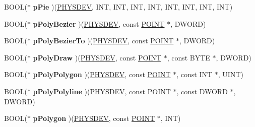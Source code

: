 \begin{DoxyCompactItemize}
\item 
\mbox{\label{structgdi__dc__funcs_a0a90d1be16b77035815899bf46dbb0e9}} 
B\+O\+OL($\ast$ {\bfseries p\+Pie} )(\hyperlink{structgdi__physdev}{P\+H\+Y\+S\+D\+EV}, I\+NT, I\+NT, I\+NT, I\+NT, I\+NT, I\+NT, I\+NT, I\+NT)
\item 
\mbox{\label{structgdi__dc__funcs_a0373ee82368c8853e6fad0bb7c0d35b0}} 
B\+O\+OL($\ast$ {\bfseries p\+Poly\+Bezier} )(\hyperlink{structgdi__physdev}{P\+H\+Y\+S\+D\+EV}, const \hyperlink{structtag_p_o_i_n_t}{P\+O\+I\+NT} $\ast$, D\+W\+O\+RD)
\item 
\mbox{\label{structgdi__dc__funcs_af45fd98166a7aa528619cf2a1243f98d}} 
B\+O\+OL($\ast$ {\bfseries p\+Poly\+Bezier\+To} )(\hyperlink{structgdi__physdev}{P\+H\+Y\+S\+D\+EV}, const \hyperlink{structtag_p_o_i_n_t}{P\+O\+I\+NT} $\ast$, D\+W\+O\+RD)
\item 
\mbox{\label{structgdi__dc__funcs_af248a7f1499c9df04a9385c5527378dc}} 
B\+O\+OL($\ast$ {\bfseries p\+Poly\+Draw} )(\hyperlink{structgdi__physdev}{P\+H\+Y\+S\+D\+EV}, const \hyperlink{structtag_p_o_i_n_t}{P\+O\+I\+NT} $\ast$, const B\+Y\+TE $\ast$, D\+W\+O\+RD)
\item 
\mbox{\label{structgdi__dc__funcs_a17a8a34aded868051182b012b9ede9ed}} 
B\+O\+OL($\ast$ {\bfseries p\+Poly\+Polygon} )(\hyperlink{structgdi__physdev}{P\+H\+Y\+S\+D\+EV}, const \hyperlink{structtag_p_o_i_n_t}{P\+O\+I\+NT} $\ast$, const I\+NT $\ast$, U\+I\+NT)
\item 
\mbox{\label{structgdi__dc__funcs_a491ad66d5326571875f33498499066d7}} 
B\+O\+OL($\ast$ {\bfseries p\+Poly\+Polyline} )(\hyperlink{structgdi__physdev}{P\+H\+Y\+S\+D\+EV}, const \hyperlink{structtag_p_o_i_n_t}{P\+O\+I\+NT} $\ast$, const D\+W\+O\+RD $\ast$, D\+W\+O\+RD)
\item 
\mbox{\label{structgdi__dc__funcs_acad4a28c329f904a1ad796de826f82b2}} 
B\+O\+OL($\ast$ {\bfseries p\+Polygon} )(\hyperlink{structgdi__physdev}{P\+H\+Y\+S\+D\+EV}, const \hyperlink{structtag_p_o_i_n_t}{P\+O\+I\+NT} $\ast$, I\+NT)
\item 
\mbox{\label{structgdi__dc__funcs_a6dd099d9ee4db87fc0e3ad98f76c96df}} 

\end{DoxyCompactItemize}
